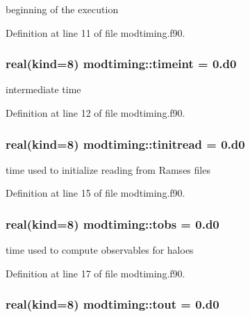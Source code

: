 beginning of the execution 



Definition at line 11 of file modtiming.\+f90.

\subsubsection[{\texorpdfstring{timeint}{timeint}}]{\setlength{\rightskip}{0pt plus 5cm}real(kind=8) modtiming\+::timeint = 0.d0}\hypertarget{namespacemodtiming_a724cb127b8168bf0645e4070d83a34c0}{}\label{namespacemodtiming_a724cb127b8168bf0645e4070d83a34c0}


intermediate time 



Definition at line 12 of file modtiming.\+f90.

\subsubsection[{\texorpdfstring{tinitread}{tinitread}}]{\setlength{\rightskip}{0pt plus 5cm}real(kind=8) modtiming\+::tinitread = 0.d0}\hypertarget{namespacemodtiming_a6c37469e0c299e5eb7c4b21eec1f2405}{}\label{namespacemodtiming_a6c37469e0c299e5eb7c4b21eec1f2405}


time used to initialize reading from Ramses files 



Definition at line 15 of file modtiming.\+f90.

\subsubsection[{\texorpdfstring{tobs}{tobs}}]{\setlength{\rightskip}{0pt plus 5cm}real(kind=8) modtiming\+::tobs = 0.d0}\hypertarget{namespacemodtiming_a83f5f02456356934410977b127c6308c}{}\label{namespacemodtiming_a83f5f02456356934410977b127c6308c}


time used to compute observables for haloes 



Definition at line 17 of file modtiming.\+f90.

\subsubsection[{\texorpdfstring{tout}{tout}}]{\setlength{\rightskip}{0pt plus 5cm}real(kind=8) modtiming\+::tout = 0.d0}\hypertarget{namespacemodtiming_aad2ce715be55a32442a507f77e24f096}{}\label{namespacemodtiming_aad2ce715be55a32442a507f77e24f096}


